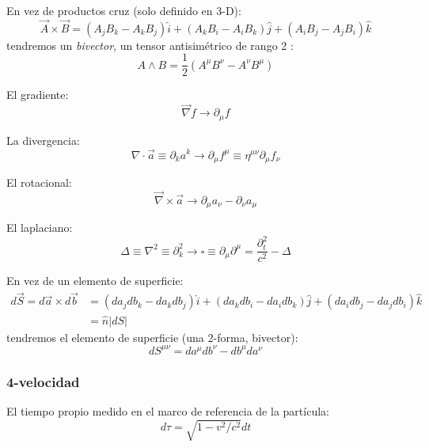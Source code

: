 \documentclass[]{report}
\numberwithin{equation}{section}
\newcommand{\0}{\textcolor{gray}{0}}
\begin{document}
En vez de productos cruz (solo definido en 3-D):
\begin{equation*}
	\vec{A}\times\vec{B} = (A_j B_k - A_k B_j)\hat{i} + (A_k B_i - A_i B_k)\hat{j} + (A_i B_j - A_j B_i)\hat{k}
\end{equation*}
tendremos un \textit{bivector}, un tensor antisimétrico de rango 2 :
\begin{equation}
	A\wedge B = \frac{1}{2}(A^\mu B^\nu - A^\nu B^\mu)
\end{equation}

El gradiente:
\begin{equation}
	\vec{\nabla} f \rightarrow \partial_\mu f
\end{equation}

La divergencia:
\begin{equation}
	\nabla\cdot\vec{a} \equiv \partial_k a^k \rightarrow \partial_\mu f^\mu \equiv \eta^{\mu\nu}\partial_\mu f_\nu
\end{equation}

El rotacional:
\begin{equation}
	\vec{\nabla}\times\vec{a} \rightarrow \partial_\mu a_\nu - \partial_\nu a_\mu
\end{equation}

El laplaciano:
\begin{equation}
	\Delta \equiv \nabla^2 \equiv \partial_k^2 \rightarrow \square \equiv \partial_\mu\partial^\mu = \frac{\partial_t^2}{c^2} - \Delta
\end{equation}

En vez de un elemento de superficie:
\begin{align*}
	d\vec{S} = d\vec{a} \times d\vec{b} &= (da_j db_k - da_k db_j)\hat{i} + (da_k db_i - da_i db_k)\hat{j} + (da_i db_j - da_j db_i)\hat{k}\\
	&= \hat{n}\left|dS\right| 
\end{align*}
tendremos el elemento de superficie (una 2-forma, bivector):
\begin{equation}
	dS^{\mu\nu} = da^\mu db^\nu - db^\mu da^\nu
\end{equation}

\subsubsection{4-velocidad}
\phantom{.}

El tiempo propio medido en el marco de referencia de la partícula:
\begin{equation}
	d\tau = \sqrt{1-v^2/c^2}dt
\end{equation}
\end{document}
